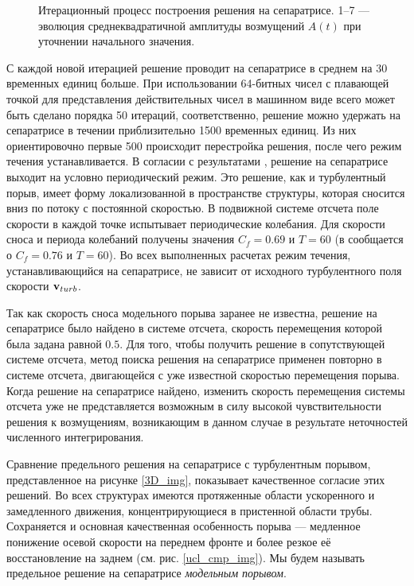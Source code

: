\begin{figure}
\caption{Итерационный процесс построения решения на сепаратрисе. 1--7 --- эволюция среднеквадратичной амплитуды возмущений $A(t)$ при уточнении начального
значения.}
\label{bisection_pic}
\end{figure}

С каждой новой итерацией решение проводит на сепаратрисе в среднем на 30 временных единиц больше. При использовании 64-битных чисел с плавающей точкой для представления действительных чисел в машинном виде всего может быть сделано порядка 50 итераций, соответственно, решение можно удержать на сепаратрисе в течении приблизительно 1500 временных единиц. Из них ориентировочно первые 500 происходит перестройка решения, после чего режим течения устанавливается. В согласии с результатами \cite{Avila2013}, решение на сепаратрисе выходит на условно периодический режим. Это решение, как и турбулентный порыв, имеет форму локализованной в пространстве структуры, которая сносится вниз по потоку с постоянной скоростью. В подвижной системе отсчета поле скорости в каждой точке испытывает периодические колебания. Для скорости сноса и периода колебаний получены значения $C_f=0.69$ и $T=60$ (в \cite{Avila2013} сообщается о $C_f=0.76$ и $T=60$). Во всех выполненных расчетах режим течения, устанавливающийся на сепаратрисе, не зависит от исходного турбулентного поля скорости $\mathbf{v}_{turb}$. 

Так как скорость сноса модельного порыва заранее не известна, решение на сепаратрисе было найдено в системе отсчета, скорость перемещения которой была задана равной $0.5$. Для того, чтобы получить решение в сопутствующей системе отсчета, метод поиска решения на сепаратрисе применен повторно в системе отсчета, двигающейся с уже известной скоростью перемещения порыва. Когда решение на сепаратрисе найдено, изменить скорость перемещения системы отсчета уже не представляется возможным в силу высокой чувствительности решения к возмущениям, возникающим в данном случае в результате неточностей численного интегрирования. 

Сравнение предельного решения на сепаратрисе с турбулентным порывом, представленное на рисунке \ref{3D_img}, показывает качественное согласие этих решений. Во всех структурах имеются протяженные области ускоренного и замедленного движения, концентрирующиеся в пристенной области трубы. Сохраняется и основная качественная особенность порыва --- медленное понижение осевой скорости на переднем фронте и более резкое её восстановление на заднем (см. рис. \ref{ucl_cmp_img}). Мы будем называть предельное решение на сепаратрисе {\it модельным порывом}.  


